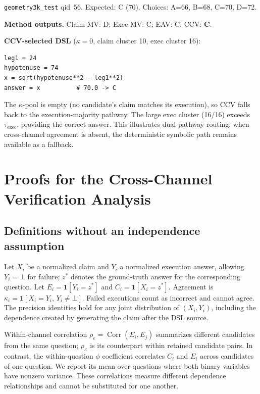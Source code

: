 \documentclass{article}
\newcommand{\ccv}{\textsc{CCV}}
\begin{document}
\texttt{geometry3k\_test} qid~56. Expected: C (70). Choices: A=66, B=68, C=70, D=72.

\smallskip
\noindent \textbf{Method outputs.} Claim MV: D; Exec MV: C; EAV: C; \ccv{}: \textbf{C}.
\smallskip

\begin{minipage}{\linewidth}
\noindent \textbf{CCV-selected DSL} ($\kappa=0$, claim cluster 10, exec cluster 16):
\begin{verbatim}
leg1 = 24
hypotenuse = 74
x = sqrt(hypotenuse**2 - leg1**2)
answer = x          # 70.0 -> C
\end{verbatim}
\end{minipage}

The $\kappa$-pool is empty (no candidate's claim matches its execution), so \ccv{} falls back to the execution-majority pathway. The large exec cluster (16/16) exceeds $\tau_{\text{exec}}$, providing the correct answer. This illustrates dual-pathway routing: when cross-channel agreement is absent, the deterministic symbolic path remains available as a fallback.

\section{Proofs for the Cross-Channel Verification Analysis}
\label{app:proofs}

\subsection{Definitions without an independence assumption}

Let $X_i$ be a normalized claim and $Y_i$ a normalized execution answer, allowing $Y_i=\bot$ for failure; $z^*$ denotes the ground-truth answer for the corresponding question. Let $E_i=\mathbf{1}[Y_i=z^*]$ and $C_i=\mathbf{1}[X_i=z^*]$. Agreement is $\kappa_i=\mathbf{1}[X_i=Y_i,\,Y_i\neq\bot]$. Failed executions count as incorrect and cannot agree. The precision identities hold for any joint distribution of $(X_i,Y_i)$, including the dependence created by generating the claim after the DSL source.

Within-channel correlation $\rho_e=\operatorname{Corr}(E_i,E_j)$ summarizes different candidates from the same question; $\rho_\kappa$ is its counterpart within retained candidate pairs. In contrast, the within-question $\phi$ coefficient correlates $C_i$ and $E_i$ across candidates of one question. We report its mean over questions where both binary variables have nonzero variance. These correlations measure different dependence relationships and cannot be substituted for one another.
\end{document}

